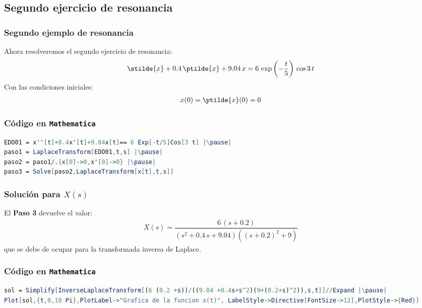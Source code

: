 \subsection{Segundo ejercicio de resonancia}
\begin{frame}
\frametitle{Segundo ejemplo de resonancia}
Ahora resolveremos el segundo ejercicio de resonancia:
\begin{align*}
\stilde{x} + 0.4 \, \ptilde{x} + 9.04 \, x = 6 \, \exp\left( -\dfrac{t}{5}\right) \, \cos 3 \, t
\end{align*}
Con las condiciones iniciales:
\begin{align*}
x(0) = \ptilde{x}(0) = 0
\end{align*}    
\end{frame}
\begin{frame}[fragile]
\frametitle{Código en \texttt{Mathematica}}
\begin{lstlisting}[language=Mathematica]
EDO01 = x''[t]+0.4x'[t]+9.04x[t]== 6 Exp[-t/5]Cos[3 t] |\pause|
paso1 = LaplaceTransform[EDO01,t,s] |\pause|
paso2 = paso1/.{x[0]->0,x'[0]->0} |\pause|
paso3 = Solve[paso2,LaplaceTransform[x[t],t,s]]
\end{lstlisting}
\end{frame}
\begin{frame}
\frametitle{Solución para $X(s)$}
El \textbf{Paso 3} devuelve el valor:
\begin{align*}
X(s) = \dfrac{6 \, (s + 0.2)}{\left(s^2 + 0.4 \, s + 9.04\right) \left((s + 0.2)^2 + 9\right)}
\end{align*}
que se debe de ocupar para la transformada inversa de Laplace.
\end{frame}
\begin{frame}[fragile]
\frametitle{Código en \texttt{Mathematica}}
\begin{lstlisting}[language=Mathematica]
sol = Simplify[InverseLaplaceTransform[(6 (0.2 +s))/((9.04 +0.4s+s^2)(9+(0.2+s)^2)),s,t]]//Expand |\pause|
Plot[sol,{t,0,10 Pi},PlotLabel->"Grafica de la funcion x(t)", LabelStyle->Directive[FontSize->12],PlotStyle->{Red}]
\end{lstlisting}
\end{frame}
